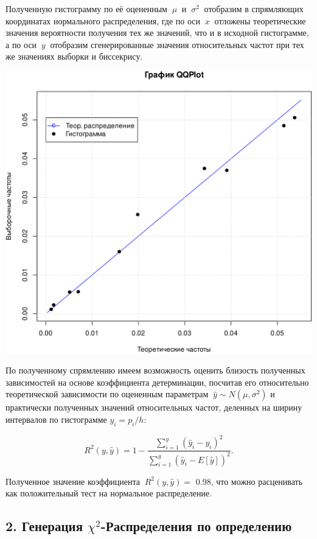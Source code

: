 \documentclass[
]{article}
\begin{document}
Полученную гистограмму по её оцененным \(\ \mu\ \) и \(\ \sigma^2\ \)
отобразим в спрямляющих координатах нормального распределения, где по
оси \(\ x\ \) отложены теоретические значения вероятности получения тех
же значений, что и в исходной гистограмме, а по оси \(\ y\ \) отобразим
сгенерированные значения относительных частот при тех же значениях
выборки и биссекрису.

\begin{center}\includegraphics[width=0.6\linewidth]{Prac4_files/figure-latex/unnamed-chunk-4-1} \end{center}

По полученному спрямлению имеем возможность оценить близость полученных
зависимостей на основе коэффициента детерминации, посчитав его
относительно теоретической зависимости по оцененным параметрам
\(\ \hat{y} \sim N(\mu, \sigma^2)\) и практически полученных значений
относительных частот, деленных на ширину интервалов по гистограмме
\(y_i = p_i / h\):

\[
R^2(y, \hat{y}) = 1 - \frac{\sum \limits_{i=1}^{g} (\hat{y}_i - y_i)^2}{\sum \limits_{i=1}^{g} (\hat{y}_i - E[\hat{y}])^2}.
\]

Полученное значение коэффициента \(\ R^2(y, \hat{y})=\) 0.98, что можно
расценивать как положительный тест на нормальное распределение.

\hypertarget{ux433ux435ux43dux435ux440ux430ux446ux438ux44f-chi2-ux440ux430ux441ux43fux440ux435ux434ux435ux43bux435ux43dux438ux44f-ux43fux43e-ux43eux43fux440ux435ux434ux435ux43bux435ux43dux438ux44e}{%
\subsection{\texorpdfstring{\textbf{2. Генерация
\(\chi^2\)-Распределения по
определению}}{2. Генерация \textbackslash chi\^{}2-Распределения по определению}}\label{ux433ux435ux43dux435ux440ux430ux446ux438ux44f-chi2-ux440ux430ux441ux43fux440ux435ux434ux435ux43bux435ux43dux438ux44f-ux43fux43e-ux43eux43fux440ux435ux434ux435ux43bux435ux43dux438ux44e}}
\end{document}
